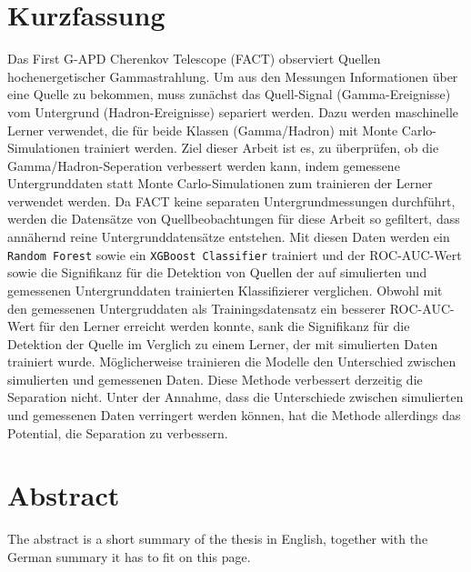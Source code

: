 \thispagestyle{plain}

\section*{Kurzfassung}
Das First G-APD Cherenkov Telescope (FACT) observiert Quellen hochenergetischer Gammastrahlung.
Um aus den Messungen Informationen über eine Quelle zu bekommen, muss zunächst das Quell-Signal (Gamma-Ereignisse) vom Untergrund (Hadron-Ereignisse) separiert werden.
Dazu werden maschinelle Lerner verwendet, die für beide Klassen (Gamma/Hadron) mit Monte Carlo-Simulationen trainiert werden.
Ziel dieser Arbeit ist es, zu überprüfen, ob die Gamma/Hadron-Seperation verbessert werden kann, indem gemessene Untergrunddaten statt Monte Carlo-Simulationen zum trainieren der Lerner verwendet werden.
Da FACT keine separaten Untergrundmessungen durchführt, werden die Datensätze von Quellbeobachtungen für diese Arbeit so gefiltert, dass annähernd reine Untergrunddatensätze entstehen.
Mit diesen Daten werden ein \texttt{Random Forest} sowie ein \texttt{XGBoost Classifier} trainiert und der ROC-AUC-Wert sowie die Signifikanz für die Detektion von Quellen der auf simulierten und gemessenen Untergrunddaten trainierten Klassifizierer verglichen. 
Obwohl mit den gemessenen Untergruddaten als Trainingsdatensatz ein besserer ROC-AUC-Wert für den Lerner erreicht werden konnte, sank die Signifikanz für die Detektion der Quelle im Verglich zu einem Lerner, der mit simulierten Daten trainiert wurde. 
Möglicherweise trainieren die Modelle den Unterschied zwischen simulierten und gemessenen Daten. 
Diese Methode verbessert derzeitig die Separation nicht. 
Unter der Annahme, dass die Unterschiede zwischen simulierten und gemessenen Daten verringert werden können, hat die Methode allerdings das Potential, die Separation zu verbessern. 
\section*{Abstract}
\begin{english}
The abstract is a short summary of the thesis in English, together with the German summary it has to fit on this page.
\end{english}
